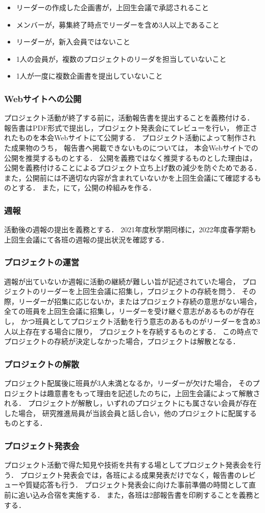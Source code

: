 \begin{itemize}
\item リーダーの作成した企画書が，上回生会議で承認されること
\item メンバーが，募集終了時点でリーダーを含め3人以上であること
\item リーダーが，新入会員ではないこと
\item 1人の会員が，複数のプロジェクトのリーダを担当していないこと
\item 1人が一度に複数企画書を提出していないこと
\end{itemize}

\subsubsection*{Webサイトへの公開}
プロジェクト活動が終了する前に，活動報告書を提出することを義務付ける．
報告書はPDF形式で提出し，プロジェクト発表会にてレビューを行い，
修正されたものを本会Webサイトにて公開する．
プロジェクト活動によって制作された成果物のうち，
報告書へ掲載できないものについては，
本会Webサイトでの公開を推奨するものとする．
公開を義務ではなく推奨するものとした理由は，
公開を義務付けることによるプロジェクト立ち上げ数の減少を防ぐためである．
また，公開前には不適切な内容が含まれていないかを上回生会議にて確認するものとする．
また，\syogaiDepartment{}にて，公開の枠組みを作る．

\subsubsection*{週報}
活動後の週報の提出を義務とする．
2021年度秋学期同様に，2022年度春学期も上回生会議にて各班の週報の提出状況を確認する．

\subsubsection*{プロジェクトの運営}
週報が出ていないか週報に活動の継続が難しい旨が記述されていた場合，
プロジェクトのリーダーを上回生会議に招集し，プロジェクトの存続を問う．
その際，リーダーが招集に応じないか，またはプロジェクト存続の意思がない場合，
全ての班員を上回生会議に招集し，リーダーを受け継ぐ意志があるものが存在し，
かつ班員としてプロジェクト活動を行う意志のあるものがリーダーを含め3人以上存在する場合に限り，
プロジェクトを存続するものとする．
この時点でプロジェクトの存続が決定しなかった場合，プロジェクトは解散となる．

\subsubsection*{プロジェクトの解散}
プロジェクト配属後に班員が3人未満となるか，リーダーが欠けた場合，
そのプロジェクトは趣意書をもって理由を記述したのちに，上回生会議によって解散される．
プロジェクトが解散し，いずれのプロジェクトにも属さない会員が存在した場合，
研究推進局員が当該会員と話し合い，他のプロジェクトに配属するものとする．

\subsubsection*{プロジェクト発表会}
プロジェクト活動で得た知見や技術を共有する場としてプロジェクト発表会を行う．
プロジェクト発表会では，各班による成果発表だけでなく，報告書のレビューや質疑応答も行う．
プロジェクト発表会に向けた事前準備の時間として直前に追い込み合宿を実施する．
また，各班は2部報告書を印刷することを義務とする．

